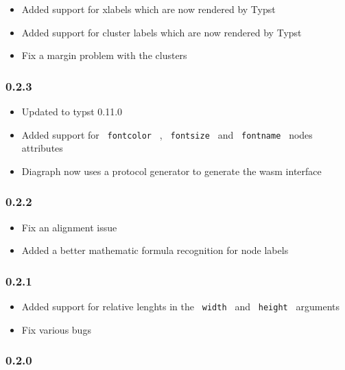 \begin{itemize}
\tightlist
\item
  Added support for xlabels which are now rendered by Typst
\item
  Added support for cluster labels which are now rendered by Typst
\item
  Fix a margin problem with the clusters
\end{itemize}

\subsubsection{0.2.3}\label{section-3}

\begin{itemize}
\tightlist
\item
  Updated to typst 0.11.0
\item
  Added support for \texttt{\ fontcolor\ } , \texttt{\ fontsize\ } and
  \texttt{\ fontname\ } nodes attributes
\item
  Diagraph now uses a protocol generator to generate the wasm interface
\end{itemize}

\subsubsection{0.2.2}\label{section-4}

\begin{itemize}
\tightlist
\item
  Fix an alignment issue
\item
  Added a better mathematic formula recognition for node labels
\end{itemize}

\subsubsection{0.2.1}\label{section-5}

\begin{itemize}
\tightlist
\item
  Added support for relative lenghts in the \texttt{\ width\ } and
  \texttt{\ height\ } arguments
\item
  Fix various bugs
\end{itemize}

\subsubsection{0.2.0}\label{section-6}

